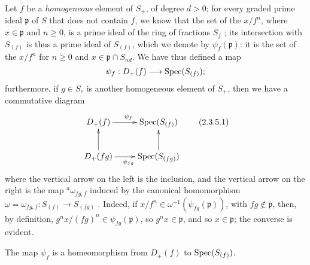 \begin{env}[2.3.5]
\label{II.2.3.5}
Let $f$ be a \emph{homogeneous} element of $S_+$, of degree $d>0$;
for every graded prime ideal $\mathfrak{p}$ of $S$ that does not contain $f$, we know that the set of the $x/f^n$, where $x\in\mathfrak{p}$ and $n\geq0$, is a prime ideal of the ring of fractions $S_f$ ;
its intersection with $S_{(f)}$ is thus a prime ideal of $S_{(f)}$, which we denote by $\psi_f(\mathfrak{p})$:
it is the set of the $x/f^n$ for $n\geq0$ and $x\in\mathfrak{p}\cap S_{nd}$.
We have thus defined a map
\[
  \psi_f: D_+(f)\to\Spec(S_{(f)});
\]
furthermore, if $g\in S_e$ is another homogeneous element of $S_+$, then we have a commutative diagram
\[
\label{II.2.3.5.1}
  \xymatrix{
    D_+(f) \ar[r]^{\psi_f}
    & \Spec(S_{(f)})
  \\D_+(fg) \ar[u] \ar[r]_{\psi_{fg}}
    & \Spec(S_{(fg)}) \ar[u]
  }
\tag{2.3.5.1}
\]
where the vertical arrow on the left is the inclusion, and the vertical arrow on the right is the map ${}^a\!\omega_{fg,f}$ induced by the canonical homomorphism $\omega=\omega_{fg,f}: S_{(f)}\to S_{(fg)}$ .
Indeed, if $x/f^n\in\omega^{-1}(\psi_{fg}(\mathfrak{p}))$, with $fg\not\in\mathfrak{p}$, then, by definition, $g^nx/(fg)^n\in\psi_{fg}(\mathfrak{p})$, so $g^nx\in\mathfrak{p}$, and so $x\in\mathfrak{p}$;
the converse is evident.
\end{env}

\begin{proposition}[2.3.6]
\label{II.2.3.6}
The map $\psi_f$ is a homeomorphism from $D_+(f)$ to $\operatorname{Spec}(S_{(f)})$.
\end{proposition}

